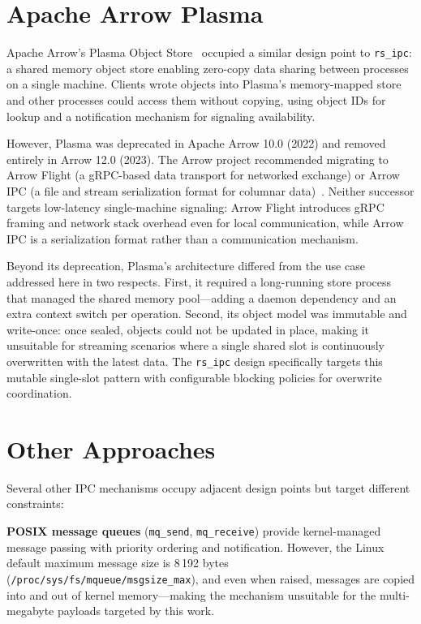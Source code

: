 \section{Apache Arrow Plasma}
\label{sec:plasma}

Apache Arrow's Plasma Object Store~\cite{arrow_plasma} occupied a similar design point to \texttt{rs\_ipc}: a shared memory object store enabling zero-copy data sharing between processes on a single machine. Clients wrote objects into Plasma's memory-mapped store and other processes could access them without copying, using object IDs for lookup and a notification mechanism for signaling availability.

However, Plasma was deprecated in Apache Arrow 10.0 (2022) and removed entirely in Arrow 12.0 (2023). The Arrow project recommended migrating to Arrow Flight (a gRPC-based data transport for networked exchange) or Arrow IPC (a file and stream serialization format for columnar data)~\cite{arrow_flight}. Neither successor targets low-latency single-machine signaling: Arrow Flight introduces gRPC framing and network stack overhead even for local communication, while Arrow IPC is a serialization format rather than a communication mechanism.

Beyond its deprecation, Plasma's architecture differed from the use case addressed here in two respects. First, it required a long-running store process that managed the shared memory pool---adding a daemon dependency and an extra context switch per operation. Second, its object model was immutable and write-once: once sealed, objects could not be updated in place, making it unsuitable for streaming scenarios where a single shared slot is continuously overwritten with the latest data. The \texttt{rs\_ipc} design specifically targets this mutable single-slot pattern with configurable blocking policies for overwrite coordination.


\section{Other Approaches}
\label{sec:other_approaches}

Several other IPC mechanisms occupy adjacent design points but target different constraints:

\textbf{POSIX message queues} (\texttt{mq\_send}, \texttt{mq\_receive}) provide kernel-managed message passing with priority ordering and notification. However, the Linux default maximum message size is 8\,192 bytes (\texttt{/proc/sys/fs/mqueue/msgsize\_max}), and even when raised, messages are copied into and out of kernel memory---making the mechanism unsuitable for the multi-megabyte payloads targeted by this work.


